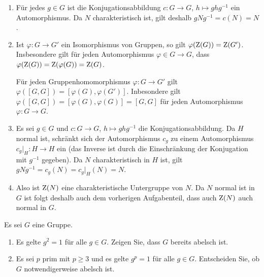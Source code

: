 \begin{solution}
  \begin{enumerate}
    \item
      Für jedes $g \in G$ ist die Konjugationsabbildung $c \colon G \to G$, $h \mapsto ghg^{-1}$ ein Automorphismus.
      Da $N$ charakteristisch ist, gilt deshalb $gNg^{-1} = c(N) = N$.
    \item
      Ist $\varphi \colon G \to G'$ ein Isomorphismus von Gruppen, so gilt $\varphi(\operatorname{Z}(G)) = \operatorname{Z}(G')$.
      Insbesondere gilt für jeden Automorphismus $\varphi \in G \to G$, dass $\varphi(\operatorname{Z}(G)) = \operatorname{Z}(\varphi(G)) = \operatorname{Z}(G)$.
      
      Für jeden Gruppenhomomorphismus $\varphi \colon G \to G'$ gilt $\varphi([G,G]) = [\varphi(G), \varphi(G')]$.
      Inbesondere gilt $\varphi([G,G]) = [\varphi(G), \varphi(G)] = [G,G]$ für jeden Automorphismus $\varphi \colon G \to G$.
    \item
      Es sei $g \in G$ und $c \colon G \to G$, $h \mapsto ghg^{-1}$ die Konjugationsabbildung.
      Da $H$ normal ist, schränkt sich der Automorphismus $c_g$ zu einem Automorphismus $c_g|_H \colon H \to H$ ein (das Inverse ist durch die Einschränkung der Konjugation mit $g^{-1}$ gegeben).
      Da $N$ charakteristisch in $H$ ist, gilt $g N g^{-1} = c_g(N) = c_g|_H(N) = N$.
    \item
      
      Also ist $\operatorname{Z}(N)$ eine charakteristische Untergruppe von $N$.
      Da $N$ normal ist in $G$ ist folgt deshalb auch dem vorherigen Aufgabenteil, dass auch $\operatorname{Z}(N)$ auch normal in $G$.
  \end{enumerate}
\end{solution}


\begin{question}[subtitle = Grupen in denen alles prime Ordnung hat]
  Es sei $G$ eine Gruppe.
  \begin{enumerate}
    \item
      Es gelte $g^2 = 1$ für alle $g \in G$.
      Zeigen Sie, dass $G$ bereits abelsch ist.
    \item
      Es sei $p$ prim mit $p \geq 3$ und es gelte $g^p = 1$ für alle $g \in G$.
      Entscheiden Sie, ob $G$ notwendigerweise abelsch ist.
  \end{enumerate}
\end{question}


